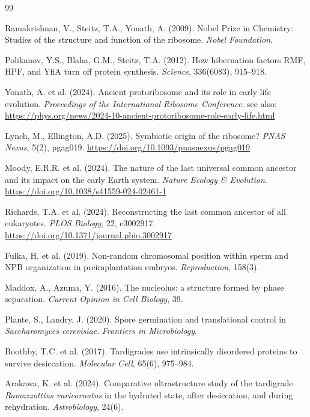 \documentclass[11pt]{article}
\theoremstyle{definition}
\begin{document}
\begin{thebibliography}{99}

Ramakrishnan, V., Steitz, T.A., Yonath, A. (2009).
Nobel Prize in Chemistry: Studies of the structure and
function of the ribosome.
\textit{Nobel Foundation}.

Polikanov, Y.S., Blaha, G.M., Steitz, T.A. (2012).
How hibernation factors RMF, HPF, and YfiA turn off
protein synthesis.
\textit{Science}, 336(6083), 915--918.

Yonath, A. et al. (2024).
Ancient protoribosome and its role in early life evolution.
\textit{Proceedings of the International Ribosome Conference};
see also: \url{https://phys.org/news/2024-10-ancient-protoribosome-role-early-life.html}

Lynch, M., Ellington, A.D. (2025).
Symbiotic origin of the ribosome?
\textit{PNAS Nexus}, 5(2), pgag019.
\url{https://doi.org/10.1093/pnasnexus/pgag019}

Moody, E.R.R. et al. (2024).
The nature of the last universal common ancestor and its
impact on the early Earth system.
\textit{Nature Ecology \& Evolution}.
\url{https://doi.org/10.1038/s41559-024-02461-1}

Richards, T.A. et al. (2024).
Reconstructing the last common ancestor of all eukaryotes.
\textit{PLOS Biology}, 22, e3002917.
\url{https://doi.org/10.1371/journal.pbio.3002917}

Fulka, H. et al. (2019).
Non-random chromosomal position within sperm and NPB
organization in preimplantation embryos.
\textit{Reproduction}, 158(3).

Maddox, A., Azuma, Y. (2016).
The nucleolus: a structure formed by phase separation.
\textit{Current Opinion in Cell Biology}, 39.

Plante, S., Landry, J. (2020).
Spore germination and translational control in
\textit{Saccharomyces cerevisiae}.
\textit{Frontiers in Microbiology}.

Boothby, T.C. et al. (2017).
Tardigrades use intrinsically disordered proteins to
survive desiccation.
\textit{Molecular Cell}, 65(6), 975--984.

Arakawa, K. et al. (2024).
Comparative ultrastructure study of the tardigrade
\textit{Ramazzottius varieornatus} in the hydrated state,
after desiccation, and during rehydration.
\textit{Astrobiology}, 24(6).


\end{thebibliography}
\end{document}
